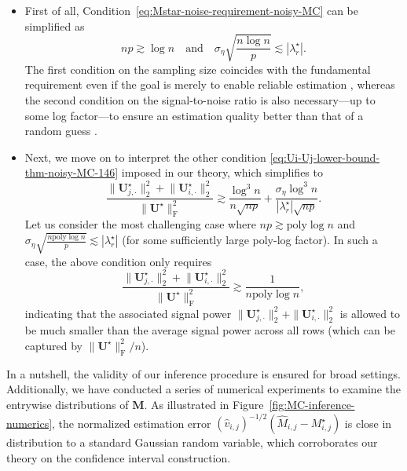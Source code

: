 \begin{itemize}

	\item First of all, Condition~\eqref{eq:Mstar-noise-requirement-noisy-MC} can be simplified as
	\[
		np  \gtrsim  \log n\quad\text{and}\quad \sigma_{\eta}\sqrt{\frac{n\log n}{p}}\lesssim |\lambda_r^{\star}|. 
	\]
	The first condition on the sampling size coincides with the fundamental requirement even if the goal is merely to enable reliable estimation \citep{candes2010NearOptimalMC}, 
	whereas the second condition on the signal-to-noise ratio is also necessary---up to some log factor---to ensure an estimation quality better than that of a random guess \citep[Theorem~3.3]{cai2019subspace}.  


	\item Next, we move on to interpret the other condition \eqref{eq:Ui-Uj-lower-bound-thm-noisy-MC-146} imposed in our theory, which simplifies to
	\[
		\frac{\big\|\bm{U}_{j,\cdot}^{\star}\big\|_{2}^{2}+\big\|\bm{U}_{i,\cdot}^{\star}\big\|_{2}^{2}}{\big\|\bm{U}^{\star}\big\|_{\mathrm{F}}^{2}}
		\gtrsim\frac{\log^{3}n}{n\sqrt{np}}+\frac{\sigma_{\eta}\log^{3}n}{|\lambda_{r}^{\star}|\sqrt{np}}.
	\]
	Let us consider the most challenging case where $np \gtrsim  \mathrm{poly}\log n$ and $\sigma_{\eta}\sqrt{\frac{n\mathrm{poly}\log n}{p}}\lesssim |\lambda_r^{\star}|$ (for some sufficiently large poly-log factor). 
	In such a case, the above condition only requires 
	\[
		\frac{\big\|\bm{U}_{j,\cdot}^{\star}\big\|_{2}^{2}+\big\|\bm{U}_{i,\cdot}^{\star}\big\|_{2}^{2}}{\big\|\bm{U}^{\star}\big\|_{\mathrm{F}}^{2}}\gtrsim\frac{1}{n\mathrm{poly}\log n},
	\]
	indicating that the associated signal power $\|\bm{U}_{j,\cdot}^{\star}\|_{2}^{2}+\|\bm{U}_{i,\cdot}^{\star}\|_{2}^{2}$ 
		is allowed to be much smaller than the average signal power across all rows (which can be captured by 
		$\|\bm{U}^{\star}\|_{\mathrm{F}}^{2}/n$). 

\end{itemize}
%
In a nutshell, the validity of our inference procedure is ensured for broad settings. 
Additionally, we have conducted a series of numerical experiments to examine the entrywise distributions of $\bm{M}$. As illustrated in Figure~\ref{fig:MC-inference-numerics}, 
the normalized estimation error $(\widehat{v}_{i,j})^{-1/2} (\widehat{M}_{i,j} - M_{i,j}^{\star})$ is close in distribution to a standard Gaussian random variable, 
which corroborates our theory on the confidence interval construction. 




